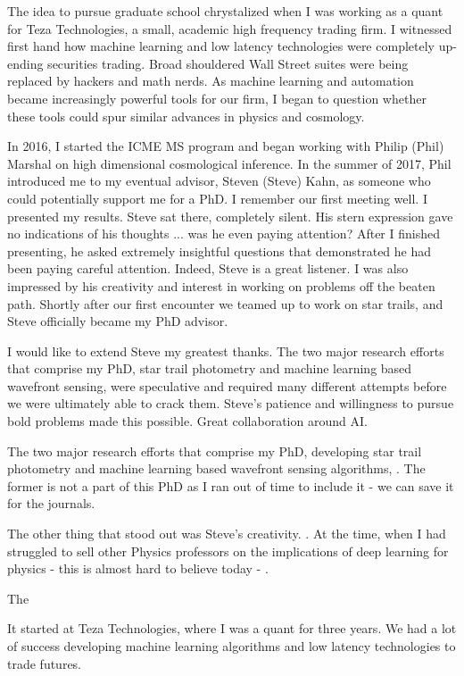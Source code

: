 
The idea to pursue graduate school chrystalized when I was working as a quant for Teza Technologies, a small, academic high frequency trading firm. I witnessed first hand how machine learning and low latency technologies were completely up-ending securities trading. Broad shouldered Wall Street suites were being replaced by hackers and math nerds. As machine learning and automation became increasingly powerful tools for our firm, I began to question whether these tools could spur similar advances in physics and cosmology. 

In 2016, I started the ICME MS program and began working with Philip (Phil) Marshal on high dimensional cosmological inference. In the summer of 2017, Phil introduced me to my eventual advisor, Steven (Steve) Kahn, as someone who could potentially support me for a PhD. I remember our first meeting well. I presented my results. Steve sat there, completely silent. His stern expression gave no indications of his thoughts ... was he even paying attention? After I finished presenting, he asked extremely insightful questions that demonstrated he had been paying careful attention. Indeed, Steve is a great listener. I was also impressed by his creativity and interest in working on problems off the beaten path. Shortly after our first encounter we teamed up to work on star trails, and Steve officially became my PhD advisor. 

I would like to extend Steve my greatest thanks. The two major research efforts that comprise my PhD, star trail photometry and machine learning based wavefront sensing, were speculative and required many different attempts before we were ultimately able to crack them. Steve's patience and willingness to pursue bold problems made this possible. Great collaboration around AI. 

The two major research efforts that comprise my PhD, developing star trail photometry and machine learning based wavefront sensing algorithms, . The former is not a part of this PhD as I ran out of time to include it - we can save it for the journals.  

The other thing that stood out was Steve's creativity. . At the time, when I had struggled to sell other Physics professors on the implications of deep learning for physics - this is almost hard to believe today - . 


The 

It started at Teza Technologies, where I was a quant for three years. We had a lot of success developing machine learning algorithms and low latency technologies to trade futures.



